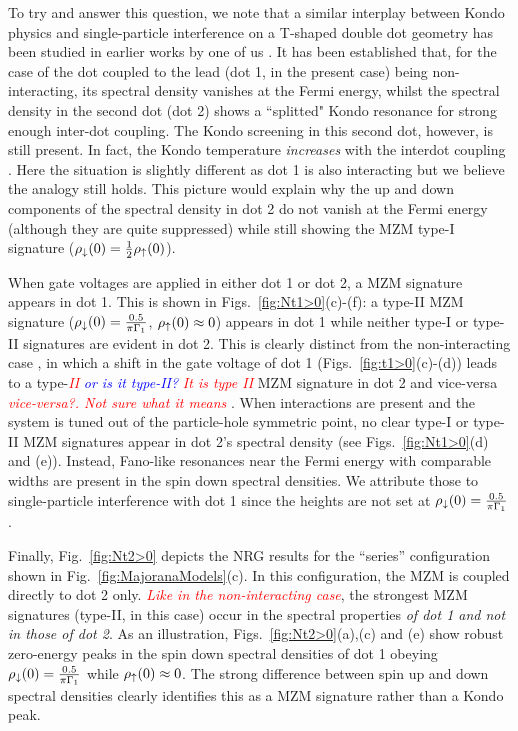 \documentclass[showpacs,aps,prb,reprint,superscriptaddress]{revtex4-2}
\newcommand{\LUIS}[1]{\textcolor{blue}{\fbox{Luis} {\sl#1}}}
\newcommand{\Jesus}[1]{\textcolor{red}{\fbox{Jesus} {\sl#1}}}
\newcommand{\change}[1]{\textcolor{red}{\sl#1}}
\begin{document}
To try and answer this question, we note that a similar interplay between Kondo physics and single-particle interference on a T-shaped double dot geometry has been studied in earlier works by one of us \cite{Silva:096603:2006,dias_da_silva_transmission_2008,DiasdaSilva:Phys.Rev.Lett.:116801:2017}. It has been established that, for the case of the dot coupled to the lead (dot 1, in the present case) being non-interacting, its spectral density vanishes at the Fermi energy, whilst the spectral density in the second dot (dot 2) shows a ``splitted" Kondo resonance for strong enough inter-dot coupling. The Kondo screening in this second dot, however, is still present. In fact, the Kondo temperature \textit{increases} with the interdot coupling \cite{Silva:096603:2006,DiasdaSilva:Phys.Rev.Lett.:116801:2017}. Here the situation is slightly different as dot 1 is also interacting but we believe the analogy still holds. This picture would explain why the up and down components of the spectral density in dot 2 do not vanish at the Fermi energy (although they are quite suppressed) while still showing the MZM type-I signature ($\rho_\downarrow(0)=\frac{1}{2}\rho_\uparrow(0)$).




When gate voltages are applied in either dot 1 or dot 2, a MZM signature appears in dot 1. This is shown in Figs.\ \ref{fig:Nt1>0}(c)-(f): a type-II MZM signature ($\rho_\downarrow(0)=\frac{0.5}{\pi \Gamma_1}$, $\rho_\uparrow(0) \approx 0$) appears in dot 1 while neither type-I or type-II signatures are evident in dot 2. This is clearly distinct from the non-interacting case , in which a shift in the gate voltage of dot 1  (Figs.\ \ref{fig:t1>0}(c)-(d)) leads to a type-\change{II} \LUIS{or is it type-II?}\Jesus{It is type II} MZM signature in dot 2 and vice-versa \Jesus{vice-versa?. Not sure what it means} . When interactions are present and the system is tuned out of the particle-hole symmetric point, no clear type-I or type-II MZM signatures appear in dot 2's spectral density (see  Figs.\ \ref{fig:Nt1>0}(d) and (e)). Instead, Fano-like resonances near the Fermi energy with comparable widths are present in the spin down spectral densities. We attribute those to single-particle interference with dot 1 since the heights are not set at  $\rho_\downarrow(0)=\frac{0.5}{\pi \Gamma_1}$.







   Finally, Fig.\ \ref{fig:Nt2>0} depicts the NRG results for the ``series'' configuration shown in Fig.\ \ref{fig:MajoranaModels}(c). In this configuration, the MZM is coupled directly to dot 2 only. \change{Like in the \textit{non-interacting} case}, the strongest MZM signatures (type-II, in this case) occur in the spectral properties \textit{of dot 1 and not in those of dot 2}.  As an illustration, Figs.\ \ref{fig:Nt2>0}(a),(c) and (e) show robust zero-energy peaks in the spin down spectral densities of dot 1 obeying $\rho_\downarrow(0)=\frac{0.5}{\pi \Gamma_1}$ while $\rho_\uparrow(0) \approx 0$. The strong difference between spin up and down spectral densities clearly identifies this as a MZM signature rather than a Kondo peak. 
   
\end{document}
